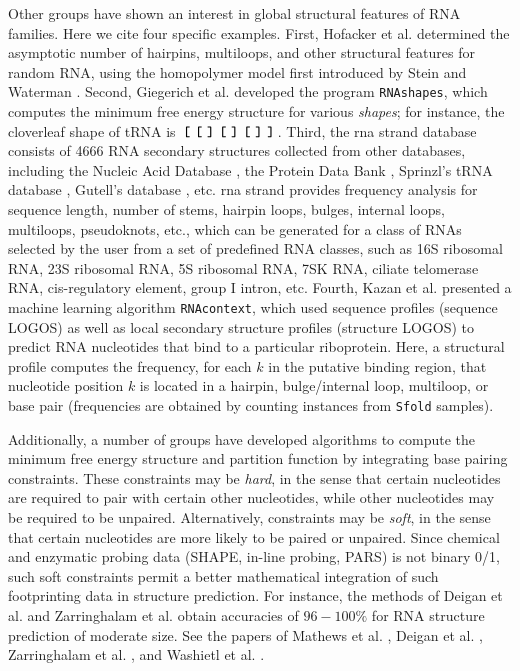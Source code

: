 Other groups have shown an interest in global structural features
of RNA families. Here we cite four specific examples.
First, Hofacker et al.  \cite{hofacker99a} determined the asymptotic
number of hairpins, multiloops, and other structural features for
random RNA, using the homopolymer model first introduced by
Stein and Waterman \cite{steinWaterman}.
Second, Giegerich et al. \cite{giegerich:shapesBioinf} developed the
program {\tt RNAshapes}, which computes the minimum free energy structure
for various {\em shapes}; for instance, the cloverleaf shape of tRNA is
$\,\mbox{\bf\texttt{[}}\, \,\mbox{\bf\texttt{[}}\, \,\mbox{\bf\texttt{]}}\, \,\mbox{\bf\texttt{[}}\, \,\mbox{\bf\texttt{]}}\, \,\mbox{\bf\texttt{[}}\, \,\mbox{\bf\texttt{]}}\, \,\mbox{\bf\texttt{]}}\,$.
Third, the {\sc rna strand} database \cite{Andronescu.bb08}
consists of 4666 RNA secondary
structures collected from other databases, including
the Nucleic Acid Database \cite{berman03}, the Protein Data Bank
\cite{Berman.acdb02}, Sprinzl's tRNA database
\cite{sprinzl}, Gutell's database \cite{gutell:ribosomalRNA}, etc.
{\sc rna strand} provides frequency analysis for sequence length,
number of stems, hairpin loops, bulges, internal loops, multiloops,
pseudoknots, etc., which can be generated for a
class of RNAs selected by the user from a set of predefined RNA classes,
such as 16S ribosomal RNA, 23S ribosomal RNA, 5S ribosomal RNA,
7SK RNA, ciliate telomerase RNA, cis-regulatory element, group I intron,
etc.
Fourth, Kazan et al. \cite{Kazan.pcb10} presented a machine learning
algorithm {\tt RNAcontext}, which used sequence profiles (sequence LOGOS)
as well as local secondary structure profiles (structure LOGOS) to
predict RNA nucleotides that bind to a particular riboprotein. Here,
a structural profile computes the frequency, for each $k$ in the putative
binding region,  that nucleotide position $k$ is located in a hairpin,
bulge/internal loop, multiloop, or base pair (frequencies are obtained
by counting instances from {\tt Sfold} samples).

Additionally, a number of groups have developed
algorithms to compute the minimum free energy structure and
partition function by integrating base pairing constraints.
These constraints may be {\em hard}, in the sense that
certain nucleotides are required to pair with certain other
nucleotides, while other nucleotides may be required to be unpaired.
Alternatively, constraints may be {\em soft}, in the sense that
certain nucleotides are more likely to be paired or unpaired.
Since chemical and enzymatic probing data (SHAPE, in-line probing,
PARS) is not binary 0/1, such soft constraints permit a better
mathematical integration of such footprinting data in structure
prediction. For instance, the methods of Deigan et al.  \cite{Deigan.pnas09}
and Zarringhalam et al.  \cite{Zarringhalam.po12} obtain accuracies
of $96-100\%$ for RNA structure prediction of moderate size.
See the papers of  Mathews et al.  \cite{mathewsConstraints},
Deigan et al. \cite{Deigan.pnas09},
Zarringhalam et al. \cite{Zarringhalam.po12}, and
Washietl et al. \cite{Washietl.nar12}.

